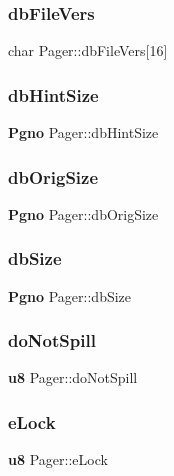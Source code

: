 \mbox{\label{struct_pager_acf03a47838eee1cf474bb93dbc834b5f}} 
\subsubsection{dbFileVers}
{\footnotesize\ttfamily char Pager\+::db\+File\+Vers[16]}

\mbox{\label{struct_pager_aa99d74d10ef3cdcf61501f9777a0246b}} 
\subsubsection{dbHintSize}
{\footnotesize\ttfamily \textbf{ Pgno} Pager\+::db\+Hint\+Size}

\mbox{\label{struct_pager_a8f9cd11d6ae3fac48182e6eae0810c6a}} 
\subsubsection{dbOrigSize}
{\footnotesize\ttfamily \textbf{ Pgno} Pager\+::db\+Orig\+Size}

\mbox{\label{struct_pager_afa5d7849190ef0a9a6f85bb15f2444b3}} 
\subsubsection{dbSize}
{\footnotesize\ttfamily \textbf{ Pgno} Pager\+::db\+Size}

\mbox{\label{struct_pager_a2f6579b3006b692a4ce1e5ad3e9a58ed}} 
\subsubsection{doNotSpill}
{\footnotesize\ttfamily \textbf{ u8} Pager\+::do\+Not\+Spill}

\mbox{\label{struct_pager_afcaf60e4b0be0995c926e3357d4bbef0}} 
\subsubsection{eLock}
{\footnotesize\ttfamily \textbf{ u8} Pager\+::e\+Lock}

